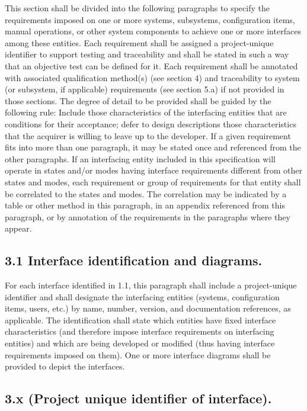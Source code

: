 This section shall be divided into the following paragraphs to specify
the requirements imposed on one or more systems, subsystems,
configuration items, manual operations, or other system components to
achieve one or more interfaces among these entities. Each requirement
shall be assigned a project-unique identifier to support testing and
traceability and shall be stated in such a way that an objective test
can be defined for it. Each requirement shall be annotated with
associated qualification method(s) (see section 4) and traceability to
system (or subsystem, if applicable) requirements (see section 5.a) if
not provided in those sections. The degree of detail to be provided
shall be guided by the following rule: Include those characteristics of
the interfacing entities that are conditions for their acceptance; defer
to design descriptions those characteristics that the acquirer is
willing to leave up to the developer. If a given requirement fits into
more than one paragraph, it may be stated once and referenced from the
other paragraphs. If an interfacing entity included in this
specification will operate in states and/or modes having interface
requirements different from other states and modes, each requirement or
group of requirements for that entity shall be correlated to the states
and modes. The correlation may be indicated by a table or other method
in this paragraph, in an appendix referenced from this paragraph, or by
annotation of the requirements in the paragraphs where they appear.

\subsection{3.1 Interface identification and diagrams.}

For each interface identified in 1.1, this paragraph shall include a
project-unique identifier and shall designate the interfacing entities
(systems, configuration items, users, etc.) by name, number, version,
and documentation references, as applicable. The identification shall
state which entities have fixed interface characteristics (and therefore
impose interface requirements on interfacing entities) and which are
being developed or modified (thus having interface requirements imposed
on them). One or more interface diagrams shall be provided to depict the
interfaces.

\subsection{3.x (Project unique identifier of interface).}


